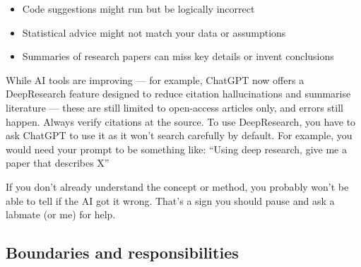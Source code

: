 \documentclass[
]{book}
\providecommand{\tightlist}{%
  \setlength{\itemsep}{0pt}\setlength{\parskip}{0pt}}
\begin{document}
\begin{itemize}
\tightlist
\item
  Code suggestions might run but be logically incorrect
\item
  Statistical advice might not match your data or assumptions
\item
  Summaries of research papers can miss key details or invent conclusions
\end{itemize}

While AI tools are improving --- for example, ChatGPT now offers a DeepResearch feature designed to reduce citation hallucinations and summarise literature --- these are still limited to open-access articles only, and errors still happen. Always verify citations at the source. To use DeepResearch, you have to ask ChatGPT to use it as it won't search carefully by default. For example, you would need your prompt to be something like: ``Using deep research, give me a paper that describes X''

If you don't already understand the concept or method, you probably won't be able to tell if the AI got it wrong. That's a sign you should pause and ask a labmate (or me) for help.

\subsection{Boundaries and responsibilities}\label{boundaries-and-responsibilities}
\end{document}
